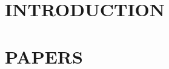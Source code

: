 \documentclass[fleqn,10pt,twoside]{book}
\begin{document}

\newpage
{}
\setcounter{page}{1}




\tableofcontents
\listoffigures
\listoftables

\newpage
\setcounter{page}{1}

\part{INTRODUCTION}

\part{PAPERS}
\end{document}
